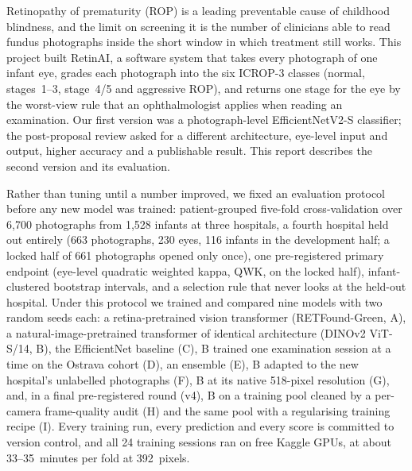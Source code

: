 \noindent Retinopathy of prematurity (ROP) is a leading preventable cause of childhood blindness, and the limit on screening it is the number of clinicians able to read fundus photographs inside the short window in which treatment still works. This project built RetinAI, a software system that takes every photograph of one infant eye, grades each photograph into the six ICROP-3 classes (normal, stages~1--3, stage~4/5 and aggressive ROP), and returns one stage for the eye by the worst-view rule that an ophthalmologist applies when reading an examination. Our first version was a photograph-level EfficientNetV2-S classifier; the post-proposal review asked for a different architecture, eye-level input and output, higher accuracy and a publishable result. This report describes the second version and its evaluation.

Rather than tuning until a number improved, we fixed an evaluation protocol before any new model was trained: patient-grouped five-fold cross-validation over 6{,}700 photographs from 1{,}528 infants at three hospitals, a fourth hospital held out entirely (663 photographs, 230 eyes, 116 infants in the development half; a locked half of 661 photographs opened only once), one pre-registered primary endpoint (eye-level quadratic weighted kappa, QWK, on the locked half), infant-clustered bootstrap intervals, and a selection rule that never looks at the held-out hospital. Under this protocol we trained and compared nine models with two random seeds each: a retina-pretrained vision transformer (RETFound-Green, A), a natural-image-pretrained transformer of identical architecture (DINOv2 ViT-S/14, B), the EfficientNet baseline (C), B trained one examination session at a time on the Ostrava cohort (D), an ensemble (E), B adapted to the new hospital's unlabelled photographs (F), B at its native 518-pixel resolution (G), and, in a final pre-registered round (v4), B on a training pool cleaned by a per-camera frame-quality audit (H) and the same pool with a regularising training recipe (I). Every training run, every prediction and every score is committed to version control, and all 24 training sessions ran on free Kaggle GPUs, at about 33--35~minutes per fold at 392~pixels.

